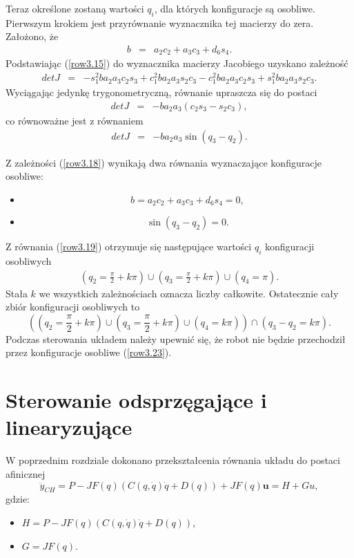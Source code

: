 \documentclass[eng,printmode]{mgr}
\begin{document}
Teraz określone zostaną  wartości $q_i$, dla których konfiguracje są osobliwe.
Pierwszym krokiem jest przyrównanie wyznacznika tej macierzy do zera. Założono, że
\begin{eqnarray}\label{row3.15}
b&=& a_2c_2+a_3c_3+d_6s_4.
\end{eqnarray}
Podstawiając (\ref{row3.15}) do wyznacznika macierzy Jacobiego uzyskano zależność
\begin{eqnarray}
detJ&=&-s_1^2ba_2a_3c_2s_3+c_1^2ba_2a_3s_2c_3-c_1^2ba_2a_3c_2s_3+s_1^2ba_2a_3s_2c_3.
\end{eqnarray}
Wyciągając jedynkę trygonometryczną, równanie upraszcza się do postaci
\begin{eqnarray}
detJ&=&-ba_2a_3(c_2s_3-s_2c_3),
\end{eqnarray}
co równoważne jest z równaniem
\begin{eqnarray}\label{row3.18}
detJ&=&-ba_2a_3\sin(q_3-q_2).
\end{eqnarray}


Z zależności (\ref{row3.18}) wynikają dwa równania wyznaczające konfiguracje osobliwe:
\begin{itemize}
\item  \begin{equation}
b=a_2c_2+a_3c_3+d_6s_4=0,\label{row3.19}
\end{equation} 
\item \begin{equation}
\sin(q_3-q_2)=0.\label{row3.20}
\end{equation}
\end{itemize}
Z równania (\ref{row3.19}) otrzymuje się następujące wartości $q_i$ konfiguracji osobliwych
\begin{eqnarray}
(q_2=\frac{\pi}{2}+k\pi) \cup (q_3=\frac{\pi}{2}+k\pi) \cup (q_4=\pi).
\end{eqnarray}
Stała $k$ we wszystkich zależnościach oznacza liczby całkowite.
Ostatecznie cały zbiór konfiguracji osobliwych to
\begin{equation}\label{row3.23}
((q_2=\frac{\pi}{2}+k\pi) \cup (q_3=\frac{\pi}{2}+k\pi) \cup (q_4=k\pi))\cap(q_3-q_2=k\pi).
\end{equation}
Podczas sterowania układem należy upewnić się, że robot nie będzie przechodził przez konfiguracje osobliwe (\ref{row3.23}).

\section{Sterowanie odsprzęgające i linearyzujące}
W poprzednim rozdziale dokonano przekształcenia równania układu do postaci afinicznej  
\begin{equation}
\ddot{y}_{CH}= P-JF(q)(C(q, \dot{q})\dot{q} + D(q))+JF(q)\textbf{u}=H+Gu,
\end{equation} 
gdzie:
\begin{itemize}
\item $H=P-JF(q)(C(q, \dot{q})\dot{q} + D(q))$,
\item $G=JF(q)$.
\end{itemize}
\end{document}
